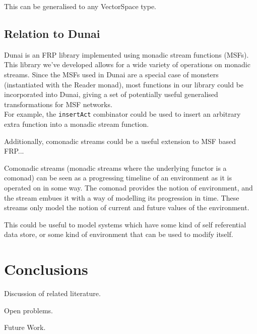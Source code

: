 \documentclass{article}
\begin{document}

This can be generalised to any VectorSpace type.

\subsection{Relation to Dunai}

Dunai \cite{frp_refactored} is an FRP library implemented using monadic stream functions (MSFs). \\

This library we've developed allows for a wide variety of operations on monadic streams. Since the MSFs used in Dunai are a special case of monsters (instantiated with the Reader monad), most functions in our library could be incorporated into Dunai, giving a set of potentially useful generalised transformations for MSF networks. \\

For example, the \verb+insertAct+ combinator could be used to insert an arbitrary extra function into a monadic stream function.

Additionally, comonadic streams could be a useful extension to MSF based FRP...

Comonadic streams (monadic streams where the underlying functor is a comonad) can be seen as a progressing timeline of an environment as it is operated on in some way. The comonad provides the notion of environment, and the stream embues it with a way of modelling its progression in time. These streams only model the notion of current and future values of the environment.

This could be useful to model systems which have some kind of self referential data store, or some kind of environment that can be used to modify itself.

\section{Conclusions}

Discussion of related literature.

Open problems.

Future Work.


\end{document}
